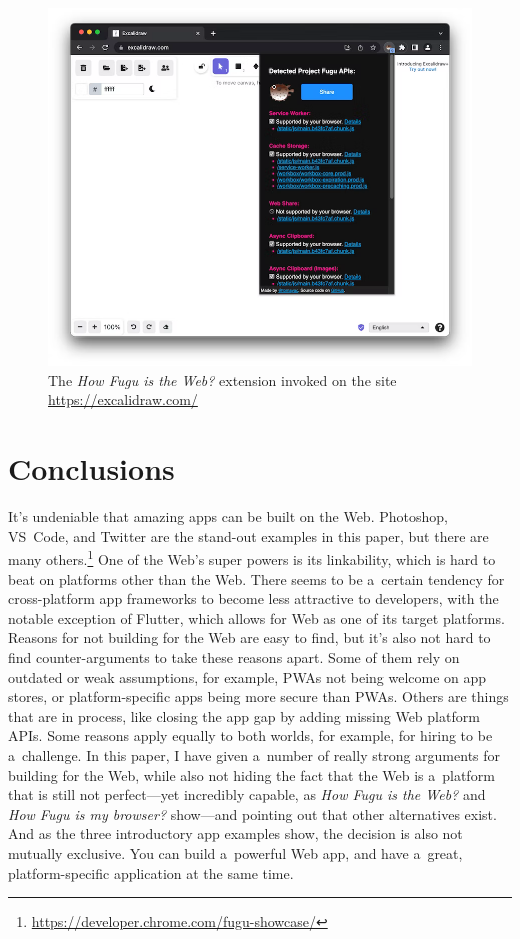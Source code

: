 \documentclass[sigconf]{acmart}
\begin{document}
\begin{figure}[t]
    \centering
    \includegraphics[width=0.9\columnwidth]{fuguweb.png}
    \caption{The \textit{How Fugu is the Web?} extension invoked on the site \url{https://excalidraw.com/}}
    \label{fig:fuguweb}
\end{figure}

\section{Conclusions}

It's undeniable that amazing apps can be built on the Web. Photoshop, VS~Code, and Twitter are the stand-out examples in this paper, but there are many others.\footnote{\url{https://developer.chrome.com/fugu-showcase/}} One of the Web's super powers is its linkability, which is hard to beat on platforms other than the Web. There seems to be a~certain tendency for cross-platform app frameworks to become less attractive to developers, with the notable exception of Flutter, which allows for Web as one of its target platforms. Reasons for not building for the Web are easy to find, but it's also not hard to find counter-arguments to take these reasons apart. Some of them rely on outdated or weak assumptions, for example, PWAs not being welcome on app stores, or platform-specific apps being more secure than PWAs. Others are things that are in process, like closing the app gap by adding missing Web platform APIs. Some reasons apply equally to both worlds, for example, for hiring to be a~challenge. In this paper, I have given a~number of really strong arguments for building for the Web, while also not hiding the fact that the Web is a~platform that is still not perfect---yet incredibly capable, as \textit{How Fugu is the Web?} and \textit{How Fugu is my browser?} show---and pointing out that other alternatives exist. And as the three introductory app examples show, the decision is also not mutually exclusive. You can build a~powerful Web app, and have a~great, platform-specific application at the same time.
\end{document}

